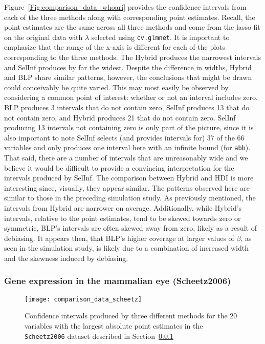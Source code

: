 Figure~\ref{Fig:comparison_data_whoari} provides the confidence intervals from each of the three methods along with corresponding point estimates. Recall, the point estimates are the same across all three methods and come from the lasso fit on the original data with $\lambda$ selected using \texttt{cv.glmnet}. It is important to emphasize that the range of the x-axis is different for each of the plots corresponding to the three methods. The Hybrid produces the narrowest intervals and SelInf produces by far the widest. Despite the difference in widths, Hybrid and BLP share similar patterns, however, the conclusions that might be drawn could conceivably be quite varied. This may most easily be observed by considering a common point of interest: whether or not an interval includes zero. BLP produces 3 intervals that do not contain zero, SelInf produces 13 that do not contain zero, and Hybrid produces 21 that do not contain zero. SelInf producing 13 intervals not containing zero is only part of the picture, since it is also important to note SelInf selects (and provides intervals for) 37 of the 66 variables and only produces one interval here with an infinite bound (for \texttt{abb}). That said, there are a number of intervals that are unreasonably wide and we believe it would be difficult to provide a convincing interpretation for the intervals produced by SelInf. The comparison between Hybrid and HDI is more interesting since, visually, they appear similar. The patterns observed here are similar to those in the preceding simulation study. As previously mentioned, the intervals from Hybrid are narrower on average. Additionally, while Hybrid's intervals, relative to the point estimates, tend to be skewed towards zero or symmetric, BLP's intervals are often skewed away from zero, likely as a result of debiasing. It appears then, that BLP's higher coverage at larger values of $\beta$, as seen in the simulation study, is likely due to a combination of increased width and the skewness induced by debiasing.  

\subsubsection{Gene expression in the mammalian eye (Scheetz2006)}\label{Sec:Scheetz2006}

\begin{figure}[hbtp]
  \texttt{[image: comparison\_data\_scheetz]}
  \caption{\label{Fig:comparison_data_scheetz} Confidence intervals produced by three different methods for the 20 variables with the largest absolute point estimates in the \texttt{Scheetz2006} dataset described in Section~\ref{Sec:Scheetz2006}}
\end{figure}


